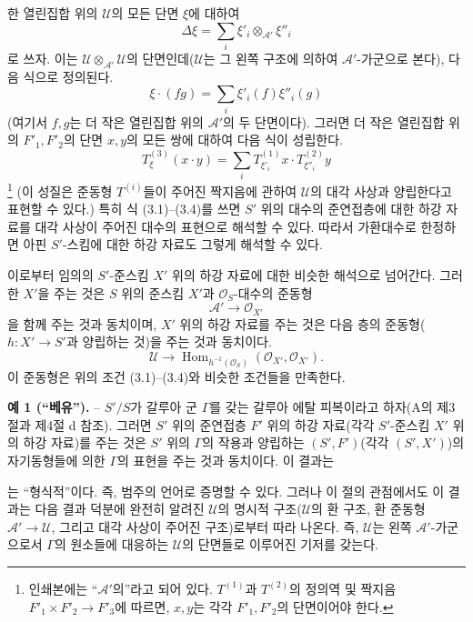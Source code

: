 한 열린집합 위의 $\mathcal U$의 모든 단면 $\xi$에 대하여
\[
  \Delta\xi=\sum_i\xi'_i\otimes_{\mathcal A'}\xi''_i
\]
로 쓰자. 이는 $\mathcal U\otimes_{\mathcal A'}\mathcal U$의
단면인데($\mathcal U$는 그 왼쪽 구조에 의하여 $\mathcal A'$-가군으로
본다), 다음 식으로 정의된다.
\[
  \xi\mathbin{\cdot}(fg)=\sum_i\xi'_i(f)\xi''_i(g)
\]
(여기서 $f,g$는 더 작은 열린집합 위의 $\mathcal A'$의 두 단면이다).
그러면 더 작은 열린집합 위의 $F'_1,F'_2$의 단면 $x,y$의 모든
쌍에 대하여 다음 식이 성립한다.
\begin{equation}
  T^{(3)}_\xi(x\mathbin{\cdot}y)
  =\sum_iT^{(1)}_{\xi'_i}x\mathbin{\cdot}T^{(2)}_{\xi''_i}y
  \tag{3.4}
\end{equation}
\footnote{인쇄본에는 “$\mathcal A'$의”라고 되어 있다.
$T^{(1)}$과 $T^{(2)}$의 정의역 및 짝지음
$F'_1\times F'_2\longrightarrow F'_3$에 따르면, $x,y$는 각각
$F'_1,F'_2$의 단면이어야 한다.} (이 성질은 준동형 $T^{(i)}$들이
주어진 짝지음에 관하여 $\mathcal U$의 대각 사상과 양립한다고
표현할 수 있다.) 특히 식 (3.1)--(3.4)를 쓰면 $S'$ 위의 대수의
준연접층에 대한 하강 자료를 대각 사상이 주어진 대수의 표현으로
해석할 수 있다. 따라서 가환대수로 한정하면 아핀 $S'$-스킴에 대한
하강 자료도 그렇게 해석할 수 있다.

이로부터 임의의 $S'$-준스킴 $X'$ 위의 하강 자료에 대한 비슷한
해석으로 넘어간다. 그러한 $X'$을 주는 것은 $S$ 위의 준스킴
$X'$과 $\mathcal O_S$-대수의 준동형
\[
  \mathcal A'\longrightarrow\mathcal O_{X'}
\]
을 함께 주는 것과 동치이며, $X'$ 위의 하강 자료를 주는 것은
다음 층의 준동형($h:X'\longrightarrow S'$과 양립하는 것)을
주는 것과 동치이다.
\[
  \mathcal U\longrightarrow
  \operatorname{Hom}_{h^{-1}(\mathcal O_S)}
  (\mathcal O_{X'},\mathcal O_{X'}).
\]
이 준동형은 위의 조건 (3.1)--(3.4)와 비슷한 조건들을 만족한다.

\textbf{예 1 (“베유”).} -- $S'/S$가 갈루아 군 $\Gamma$를 갖는
갈루아 에탈 피복이라고 하자(A의 제3절과 제4절 d 참조). 그러면
$S'$ 위의 준연접층 $F'$ 위의 하강 자료(각각 $S'$-준스킴 $X'$ 위의
하강 자료)를 주는 것은 $S'$ 위의 $\Gamma$의 작용과 양립하는
$(S',F')$(각각 $(S',X')$)의 자기동형들에 의한 $\Gamma$의 표현을
주는 것과 동치이다. 이 결과는

는 “형식적”이다. 즉, 범주의 언어로 증명할 수 있다. 그러나 이 절의
관점에서도 이 결과는 다음 결과 덕분에 완전히 알려진 $\mathcal U$의 명시적
구조($\mathcal U$의 환 구조, 환 준동형
$\mathcal A'\longrightarrow\mathcal U$, 그리고 대각 사상이 주어진 구조)로부터
따라 나온다. 즉, $\mathcal U$는 왼쪽 $\mathcal A'$-가군으로서
$\Gamma$의 원소들에 대응하는 $\mathcal U$의 단면들로 이루어진 기저를 갖는다.

